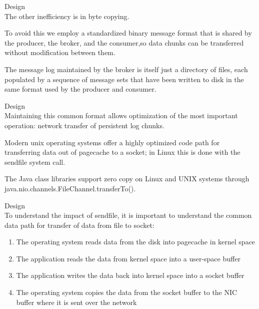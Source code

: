 \begin{frame}[plain,t]{Design} %
     \\
    \vspace{2ex}
    The other inefficiency is in byte copying.
    
    \vspace{2ex}
    To avoid this we employ a standardized binary message format that is shared by the producer, the broker, and the consumer,so data chunks can be transferred without modification between them.
    
     \vspace{2ex}
     
     The message log maintained by the broker is itself just a directory of files, each populated by a sequence of message sets that have been written to disk in the same format used by the producer and consumer. 
    
    
    
    
\end{frame}
\begin{frame}[plain,t]{Design} %
     \\
   
    \vspace{2ex}
    Maintaining this common format allows optimization of the most important operation: network transfer of persistent log chunks. 
    
    \vspace{2ex}
    Modern unix operating systems offer a highly optimized code path for transferring data out of pagecache to a socket; in Linux this is done with the sendfile system call.
    
     \vspace{2ex}
    The Java class libraries support zero copy on Linux and UNIX systems through  java.nio.channels.FileChannel.transferTo(). 
    
    
    
\end{frame}
\begin{frame}[plain,t]{Design} %
     \\
    \vspace{2ex}
    To understand the impact of sendfile, it is important to understand the common data path for transfer of data from file to socket:
    \begin{enumerate}
        \item The operating system reads data from the disk into pagecache in kernel space
        \item The application reads the data from kernel space into a user-space buffer
        \item The application writes the data back into kernel space into a socket buffer
        \item The operating system copies the data from the socket buffer to the NIC buffer where it is sent over the network
    \end{enumerate}

\end{frame}
